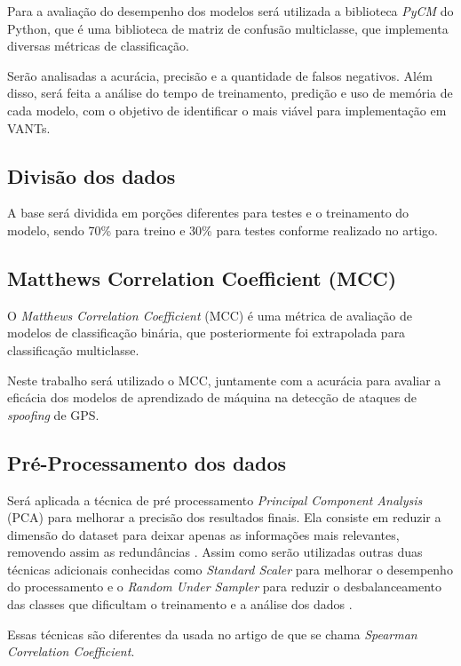 \documentclass[12pt]{article}
\begin{document}
Para a avaliação do desempenho dos modelos
será utilizada a biblioteca \textit{PyCM} do Python,
que é uma biblioteca de matriz de confusão
multiclasse, que implementa diversas métricas de classificação.
\cite{Haghighi2018}

Serão analisadas a acurácia,
precisão e a quantidade de falsos negativos.
Além disso, será feita a análise do tempo de treinamento,
predição e uso de memória de cada modelo,
com o objetivo de identificar o mais viável
para implementação em VANTs.

\subsection{Divisão dos dados}
A base será dividida em porções
diferentes para testes e o treinamento do modelo,
sendo 70\% para treino e 30\% para testes
conforme realizado no artigo. \cite{Aissou2021}

\subsection{Matthews Correlation Coefficient (MCC)}
O \textit{Matthews Correlation Coefficient} (MCC) é uma métrica
de avaliação de modelos de classificação binária,
que posteriormente foi extrapolada para classificação multiclasse. \cite{MCC}

Neste trabalho será utilizado o MCC,
juntamente com a acurácia para avaliar a eficácia
dos modelos de aprendizado de máquina
na detecção de ataques de \textit{spoofing} de GPS.

\subsection{Pré-Processamento dos dados}

Será aplicada a técnica de pré processamento
\textit{Principal Component Analysis} (PCA) para melhorar
a precisão dos resultados finais. Ela consiste em reduzir a
dimensão do dataset para deixar apenas as informações mais relevantes,
removendo assim as redundâncias \cite {pearson1901}. 
Assim como serão utilizadas
outras duas técnicas adicionais conhecidas como \textit{Standard Scaler} para
melhorar o desempenho do processamento \cite {pearson1901} e o
\textit{Random Under Sampler} para reduzir o desbalanceamento das classes
que dificultam o treinamento e a análise dos dados \cite {japkowicz2000}.

Essas técnicas são
diferentes da usada no artigo de \cite{Aissou2021}
que se chama \textit{Spearman Correlation Coefficient}.
\end{document}
